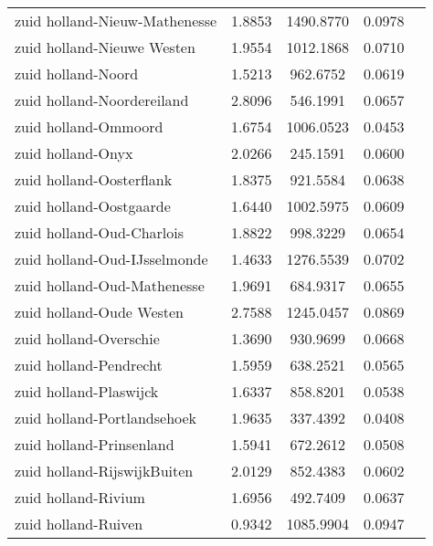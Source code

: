 \begin{longtable}{llccc}
	zuid holland-Nieuw-Mathenesse             & 1.8853  & 1490.8770 & 0.0978                 \\
	zuid holland-Nieuwe Westen                & 1.9554  & 1012.1868 & 0.0710                 \\
	zuid holland-Noord                        & 1.5213  & 962.6752  & 0.0619                 \\
	zuid holland-Noordereiland                & 2.8096  & 546.1991  & 0.0657                 \\
	zuid holland-Ommoord                      & 1.6754  & 1006.0523 & 0.0453                 \\
	zuid holland-Onyx                         & 2.0266  & 245.1591  & 0.0600                 \\
	zuid holland-Oosterflank                  & 1.8375  & 921.5584  & 0.0638                 \\
	zuid holland-Oostgaarde                   & 1.6440  & 1002.5975 & 0.0609                 \\
	zuid holland-Oud-Charlois                 & 1.8822  & 998.3229  & 0.0654                 \\
	zuid holland-Oud-IJsselmonde              & 1.4633  & 1276.5539 & 0.0702                 \\
	zuid holland-Oud-Mathenesse               & 1.9691  & 684.9317  & 0.0655                 \\
	zuid holland-Oude Westen                  & 2.7588  & 1245.0457 & 0.0869                 \\
	zuid holland-Overschie                    & 1.3690  & 930.9699  & 0.0668                 \\
	zuid holland-Pendrecht                    & 1.5959  & 638.2521  & 0.0565                 \\
	zuid holland-Plaswijck                    & 1.6337  & 858.8201  & 0.0538                 \\
	zuid holland-Portlandsehoek               & 1.9635  & 337.4392  & 0.0408                 \\
	zuid holland-Prinsenland                  & 1.5941  & 672.2612  & 0.0508                 \\
	zuid holland-RijswijkBuiten               & 2.0129  & 852.4383  & 0.0602                 \\
	zuid holland-Rivium                       & 1.6956  & 492.7409  & 0.0637                 \\
	zuid holland-Ruiven                       & 0.9342  & 1085.9904 & 0.0947                 \\

\end{longtable}

